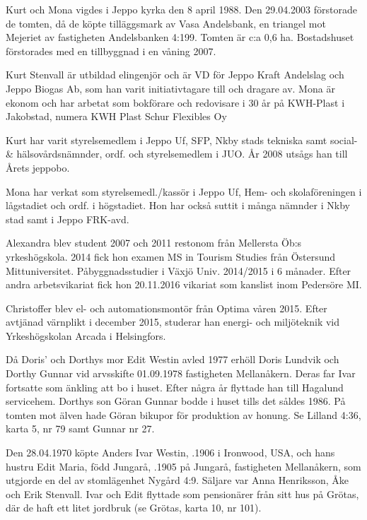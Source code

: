Kurt och Mona vigdes i Jeppo	kyrka den 8 april 1988. Den 29.04.2003 förstorade de tomten, då de köpte tilläggsmark av Vasa Andelsbank, en triangel mot Mejeriet av fastigheten Andelsbanken 4:199. Tomten är c:a 0,6 ha.	Bostadshuset förstorades med en tillbyggnad i en våning 2007.

Kurt Stenvall är utbildad elingenjör och är VD för Jeppo Kraft Andelslag och Jeppo Biogas Ab, som han varit initiativtagare till och dragare av. Mona är ekonom och har arbetat som bokförare och redovisare i 30 år på	KWH-Plast i Jakobstad, numera KWH Plast Schur Flexibles Oy
\begin{jhchildren}
  \item {}
  \item {}
\end{jhchildren}
Kurt har varit styrelsemedlem i Jeppo Uf, SFP, Nkby stads tekniska samt social- \& hälsovårdsnämnder, ordf. och styrelsemedlem i JUO. År 2008 utsågs han till Årets jeppobo.

Mona har verkat som styrelsemedl./kassör i Jeppo Uf, Hem- och skolaföreningen i lågstadiet och ordf. i högstadiet. Hon har också suttit i många nämnder i Nkby stad samt i Jeppo FRK-avd.

Alexandra blev student 2007 och 2011 restonom från Mellersta Öb:s yrkeshögskola. 2014 fick hon examen MS in Tourism Studies från Östersund Mittuniversitet. Påbyggnadsstudier i Växjö Univ. 2014/2015 i 6 månader. Efter andra arbetsvikariat fick hon 20.11.2016 vikariat som kanslist inom Pedersöre MI.

Christoffer blev el- och automationsmontör från Optima våren 2015. Efter avtjänad värnplikt i december 2015, studerar han energi- och miljöteknik vid Yrkeshögskolan Arcada i Helsingfors.


%
Då Doris' och Dorthys mor Edit Westin avled 1977 erhöll Doris Lundvik och Dorthy Gunnar vid arvsskifte 01.09.1978 fastigheten Mellanåkern. Deras far Ivar fortsatte som änkling att bo i huset. Efter några år flyttade han till Hagalund servicehem. Dorthys son Göran Gunnar bodde i huset tills det såldes 1986. På tomten mot älven hade Göran bikupor för produktion av honung. Se Lilland 4:36, karta 5, nr 79 samt Gunnar nr 27.


%
Den 28.04.1970 köpte Anders Ivar Westin, .1906 i Ironwood, USA, och hans hustru Edit Maria, född Jungarå, .1905 	på Jungarå,	fastigheten Mellanåkern, som utgjorde en del av stomlägenhet Nygård 4:9. Säljare var Anna Henriksson, Åke och Erik Stenvall. Ivar och Edit flyttade som pensionärer från sitt hus på Grötas, där de haft ett litet jordbruk (se Grötas, karta 10, nr 101).


